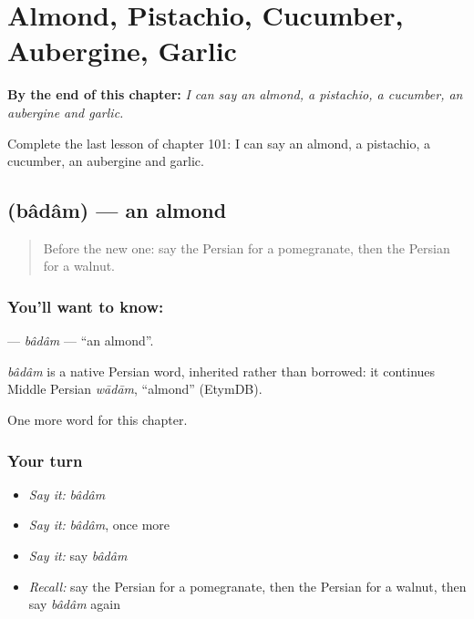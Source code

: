
\chapter{Almond, Pistachio, Cucumber, Aubergine, Garlic}
\label{ch:fa-almond-pistachio-cucumber-aubergine-garlic}

\begin{chapteropening}
\textbf{By the end of this chapter:} \emph{I can say an almond, a pistachio, a cucumber, an aubergine and garlic.}

Complete the last lesson of chapter 101: I can say an almond, a pistachio, a cucumber, an aubergine and garlic.
\end{chapteropening}

\section[\texorpdfstring{\fa{بادام} (bâdâm)}{بادام (bâdâm)}]{ (bâdâm) — an almond}

\label{lesson:FA-C101-badam}



\begin{quote}
Before the new one: say the Persian for a pomegranate, then the Persian for a walnut.
\end{quote}

\subsection*{You'll want to know: }
\textbf{} — \emph{bâdâm} — \textquotedblleft{}an almond\textquotedblright{}.

\begin{cousinweb}
\emph{bâdâm} is a native Persian word, inherited rather than borrowed: it continues Middle Persian \emph{wādām}, \textquotedblleft{}almond\textquotedblright{} (EtymDB).
\end{cousinweb}

\begin{grammarlens}[title={What you've built}]
One more word for this chapter.
\end{grammarlens}

\subsection*{Your turn}
\begin{itemize}
\raggedright
  \item \emph{Say it:} \emph{bâdâm}
  \item \emph{Say it:} \emph{bâdâm}, once more
  \item \emph{Say it:} say \emph{bâdâm}
  \item \emph{Recall:} say the Persian for a pomegranate, then the Persian for a walnut, then say \emph{bâdâm} again
\end{itemize}

